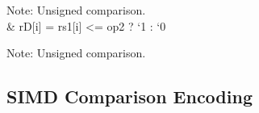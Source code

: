 \documentclass[letterpaper,10pt,english]{sphinxmanual}
\begin{document}
\begin{savenotes}
\begin{tabular}[t]{}
\sphinxAtStartPar
Note: Unsigned comparison.
\\
\sphinxhline
\sphinxAtStartPar
{}
&
\sphinxAtStartPar
rD{[}i{]} = rs1{[}i{]} \textless{}= op2 ? ‘1 : ‘0

\sphinxAtStartPar
Note: Unsigned comparison.
\\
\sphinxbottomrule
\end{tabular}
\sphinxtableafterendhook\par
\sphinxattableend\end{savenotes}


\subsection{SIMD Comparison Encoding}
\label{\detokenize{instruction_set_extensions:simd-comparison-encoding}}
\end{document}
